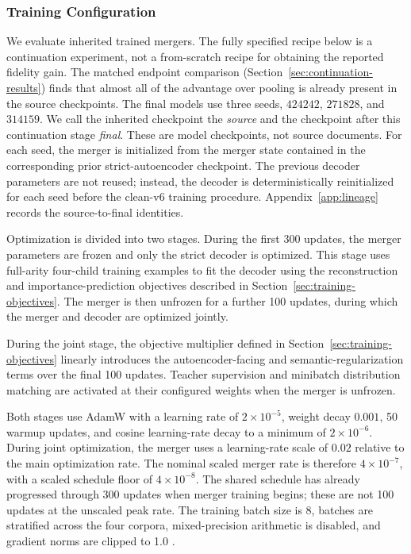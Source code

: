 \documentclass[10pt]{article}
\begin{document}
\subsubsection{Training Configuration}
\label{sec:training-configuration}

We evaluate inherited trained mergers. The fully specified recipe below is a
continuation experiment, not a from-scratch recipe for obtaining the reported
fidelity gain. The matched endpoint comparison
(Section~\ref{sec:continuation-results}) finds that almost all of the advantage
over pooling is already present in the source checkpoints.
The final models use three seeds,
\(424242\), \(271828\), and \(314159\). We call the inherited
checkpoint the \emph{source} and the checkpoint after this continuation stage
\emph{final}. These are model checkpoints, not source documents. For
each seed, the merger is initialized from the merger state contained in the
corresponding prior strict-autoencoder checkpoint. The previous decoder parameters are not
reused; instead, the decoder is deterministically reinitialized for each seed
before the clean-v6 training procedure. Appendix~\ref{app:lineage} records the source-to-final identities.

Optimization is divided into two stages. During the first 300 updates, the
merger parameters are frozen and only the strict decoder is optimized. This
stage uses full-arity four-child training examples to fit the decoder using the
reconstruction and importance-prediction objectives described in
Section~\ref{sec:training-objectives}. The merger is then unfrozen for a further 100 updates, during
which the merger and decoder are optimized jointly.

During the joint stage, the objective multiplier defined in Section~\ref{sec:training-objectives} linearly introduces the autoencoder-facing and semantic-regularization terms over the final 100 updates. Teacher supervision and minibatch distribution matching are activated at their configured weights when the merger is unfrozen.

Both stages use AdamW \citep{loshchilov-hutter-2019-adamw} with a learning rate of \(2\times10^{-5}\), weight decay
\(0.001\), 50 warmup updates, and cosine learning-rate decay \citep{loshchilov-hutter-2017-sgdr} to a minimum of
\(2\times10^{-6}\). During joint optimization, the merger uses a
learning-rate scale of \(0.02\) relative to the main optimization rate.
The nominal scaled merger rate is therefore \(4\times10^{-7}\), with a scaled
schedule floor of \(4\times10^{-8}\). The shared schedule has already progressed
through 300 updates when merger training begins; these are not 100 updates at
the unscaled peak rate. The training batch size is 8, batches are stratified across the four corpora, mixed-precision arithmetic is disabled, and gradient norms are clipped to 1.0 \citep{pascanu-etal-2013-gradient-clipping}.
\end{document}
